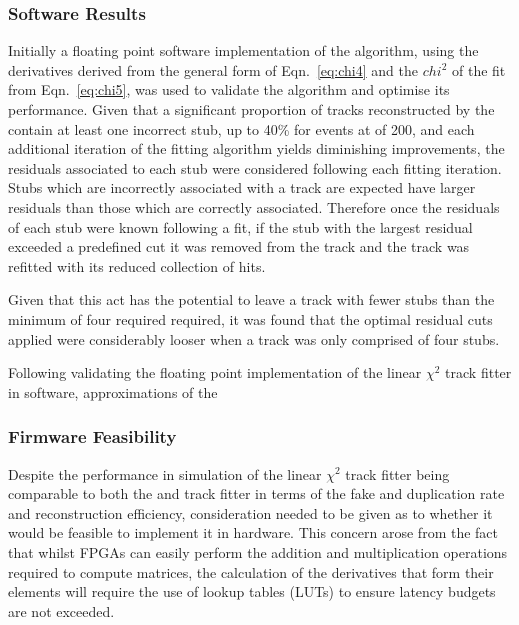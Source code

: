 \subsubsection{Software Results}\label{subsubsec:chi2software}
Initially a floating point software implementation of the algorithm, using the derivatives derived from the general form of Eqn.~\ref{eq:chi4} and the $chi^{2}$ of the fit from  Eqn.~\ref{eq:chi5}, was used to validate the algorithm and optimise its performance.
Given that a significant proportion of tracks reconstructed by the \HT contain at least one incorrect stub, up to 40\% for \ttbar events at \PU of 200, and each additional iteration of the fitting algorithm yields diminishing improvements, the residuals associated to each stub were considered following each fitting iteration.
Stubs which are incorrectly associated with a track are expected have larger residuals than those which are correctly associated.
Therefore once the residuals of each stub were known following a fit, if the stub with the largest residual exceeded a predefined cut it was removed from the track and the track was refitted with its reduced collection of hits. 



Given that this act has the potential to leave a track with fewer stubs than the minimum of four required required, it was found that the optimal residual cuts applied were considerably looser when a track was only comprised of four stubs.

Following validating the floating point implementation of the linear $\chi^{2}$ track fitter in software, approximations of the 




\subsubsection{Firmware Feasibility}\label{subsubsec:chi2firmware}
Despite the performance in simulation of the linear $\chi^{2}$ track fitter being comparable to both the \KF and \LR track fitter in terms of the fake and duplication rate and reconstruction efficiency, consideration needed to be given as to whether it would be feasible to implement it in hardware.
This concern arose from the fact that whilst FPGAs can easily perform the addition and multiplication operations required to compute matrices, the calculation of the derivatives that form their elements will require the use of lookup tables (LUTs) to ensure latency budgets are not exceeded.

